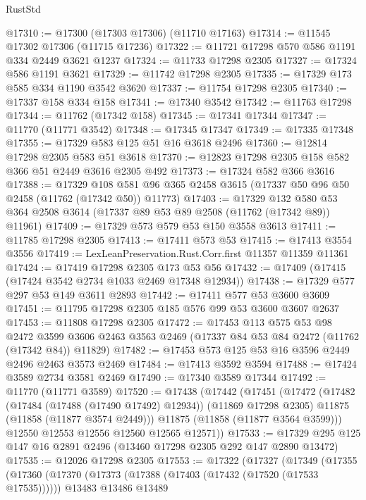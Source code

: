 \begin{lexlean}{RustStd}
\begin{coremodule}
@17310 := @17300 (@17303 @17306) (@11710 @17163)
@17314 := @11545 @17302 @17306 (@11715 @17236)
@17322 := @11721 @17298 @570 @586 @1191 @334 @2449 @3621 @1237
@17324 := @11733 @17298 @2305
@17327 := @17324 @586 @1191 @3621
@17329 := @11742 @17298 @2305
@17335 := @17329 @173 @585 @334 @1190 @3542 @3620
@17337 := @11754 @17298 @2305
@17340 := @17337 @158 @334 @158
@17341 := @17340 @3542
@17342 := @11763 @17298
@17344 := @11762 (@17342 @158)
@17345 := @17341 @17344
@17347 := @11770 (@11771 @3542)
@17348 := @17345 @17347
@17349 := @17335 @17348
@17355 := @17329 @583 @125 @51 @16 @3618 @2496
@17360 := @12814 @17298 @2305 @583 @51 @3618
@17370 := @12823 @17298 @2305 @158 @582 @366 @51 @2449 @3616 @2305 @492
@17373 := @17324 @582 @366 @3616
@17388 := @17329
    @108
    @581
    @96
    @365
    @2458
    @3615
    (@17337 @50 @96 @50 @2458 (@11762 (@17342 @50)) @11773)
@17403 := @17329
    @132
    @580
    @53
    @364
    @2508
    @3614
    (@17337 @89 @53 @89 @2508 (@11762 (@17342 @89)) @11961)
@17409 := @17329 @573 @579 @53 @150 @3558 @3613
@17411 := @11785 @17298 @2305
@17413 := @17411 @573 @53
@17415 := @17413 @3554 @3556
@17419 := LexLeanPreservation.Rust.Corr.first @11357 @11359 @11361
@17424 := @17419 @17298 @2305 @173 @53 @56
@17432 := @17409 (@17415 (@17424 @3542 @2734 @1033 @2469 @17348 @12934))
@17438 := @17329 @577 @297 @53 @149 @3611 @2893
@17442 := @17411 @577 @53 @3600 @3609
@17451 := @11795 @17298 @2305 @185 @576 @99 @53 @3600 @3607 @2637
@17453 := @11808 @17298 @2305
@17472 := @17453
    @113
    @575
    @53
    @98
    @2472
    @3599
    @3606
    @2463
    @3563
    @2469
    (@17337 @84 @53 @84 @2472 (@11762 (@17342 @84)) @11829)
@17482 := @17453 @573 @125 @53 @16 @3596 @2449 @2496 @2463 @3573 @2469
@17484 := @17413 @3592 @3594
@17488 := @17424 @3589 @2734 @3581 @2469
@17490 := @17340 @3589 @17344
@17492 := @11770 (@11771 @3589)
@17520 := @17438
    (@17442
      (@17451
        (@17472
          (@17482
            (@17484 (@17488 (@17490 @17492) @12934))
            (@11869 @17298 @2305)
            @11875
            (@11858 (@11877 @3574 @2449)))
          @11875
          (@11858 (@11877 @3564 @3599)))
        @12550
        @12553
        @12556
        @12560
        @12565
        @12571))
@17533 := @17329 @295 @125 @147 @16 @2891 @2496 (@13460 @17298 @2305 @292 @147 @2890 @13472)
@17535 := @12026 @17298 @2305
@17553 := @17322
    (@17327
      (@17349
        (@17355
          (@17360
            (@17370
              (@17373 (@17388 (@17403 (@17432 (@17520 (@17533 @17535))))))
              @13483
              @13486
              @13489

\end{coremodule}
\end{lexlean}
